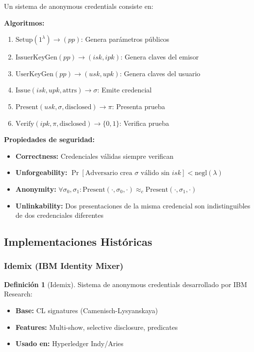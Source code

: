 \documentclass[11pt,a4paper,twoside]{book}
\theoremstyle{definition}
\newtheorem{definition}{Definición}[chapter]
\theoremstyle{remark}
\begin{document}
\begin{mathnote}
Un sistema de anonymous credentials consiste en:

\textbf{Algoritmos:}
\begin{enumerate}
    \item $\text{Setup}(1^\lambda) \to (pp)$: Genera parámetros públicos
    \item $\text{IssuerKeyGen}(pp) \to (isk, ipk)$: Genera claves del emisor
    \item $\text{UserKeyGen}(pp) \to (usk, upk)$: Genera claves del usuario
    \item $\text{Issue}(isk, upk, \text{attrs}) \to \sigma$: Emite credencial
    \item $\text{Present}(usk, \sigma, \text{disclosed}) \to \pi$: Presenta prueba
    \item $\text{Verify}(ipk, \pi, \text{disclosed}) \to \{0,1\}$: Verifica prueba
\end{enumerate}

\textbf{Propiedades de seguridad:}
\begin{itemize}
    \item \textbf{Correctness:} Credenciales válidas siempre verifican
    \item \textbf{Unforgeability:} $\Pr[\text{Adversario crea } \sigma \text{ válido sin } isk] < \text{negl}(\lambda)$
    \item \textbf{Anonymity:} $\forall \sigma_0, \sigma_1: \text{Present}(\cdot, \sigma_0, \cdot) \approx_c \text{Present}(\cdot, \sigma_1, \cdot)$
    \item \textbf{Unlinkability:} Dos presentaciones de la misma credencial son indistinguibles de dos credenciales diferentes
\end{itemize}
\end{mathnote}

\subsection{Implementaciones Históricas}

\subsubsection{Idemix (IBM Identity Mixer)}

\begin{definition}[Idemix]
Sistema de anonymous credentials desarrollado por IBM Research:
\begin{itemize}
    \item \textbf{Base:} CL signatures (Camenisch-Lysyanskaya)
    \item \textbf{Features:} Multi-show, selective disclosure, predicates
    \item \textbf{Usado en:} Hyperledger Indy/Aries
\end{itemize}
\end{definition}
\end{document}
